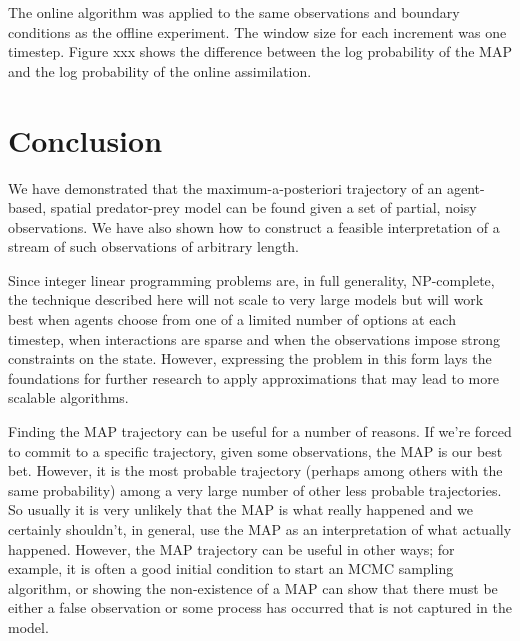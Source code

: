 \documentclass{article}
\begin{document}
The online algorithm was applied to the same observations and boundary conditions as the offline experiment. The window size for each increment was one timestep. Figure xxx shows the difference between the log probability of the MAP and the log probability of the online assimilation.



\section{Conclusion}

We have demonstrated that the maximum-a-posteriori trajectory of an agent-based, spatial predator-prey model can be found given a set of partial, noisy observations. We have also shown how to construct a feasible interpretation of a stream of such observations of arbitrary length.

Since integer linear programming problems are, in full generality, NP-complete, the technique described here will not scale to very large models but will work best when agents choose from one of a limited number of options at each timestep, when interactions are sparse and when the observations impose strong constraints on the state. However, expressing the problem in this form lays the foundations for further research to apply approximations that may lead to more scalable algorithms.

Finding the MAP trajectory can be useful for a number of reasons. If we're forced to commit to a specific trajectory, given some observations, the MAP is our best bet. However, it is the most probable trajectory (perhaps among others with the same probability) among a very large number of other less probable trajectories. So usually it is very unlikely that the MAP is what really happened and we certainly shouldn't, in general, use the MAP as an interpretation of what actually happened. However, the MAP trajectory can be useful in other ways; for example, it is often a good initial condition to start an MCMC sampling algorithm, or showing the non-existence of a MAP can show that there must be either a false observation or some process has occurred that is not captured in the model.




%
% 


\end{document}
